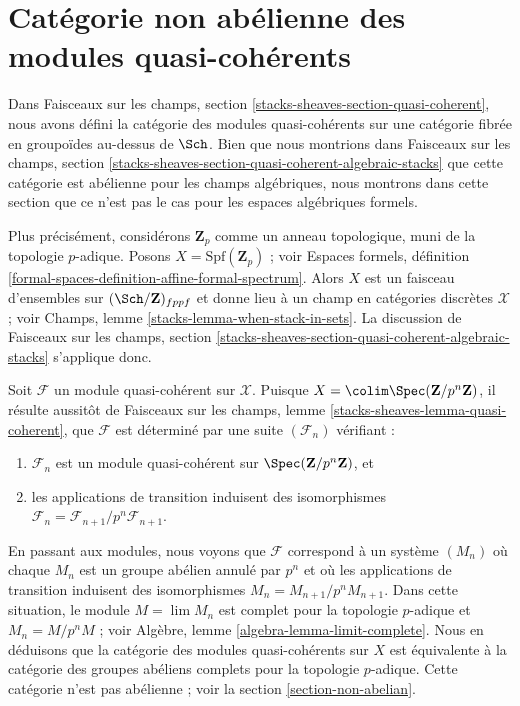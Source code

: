 \section{Catégorie non abélienne des modules quasi-cohérents}
\label{section-nonabelian-QCoh}

\noindent
Dans Faisceaux sur les champs, section \ref{stacks-sheaves-section-quasi-coherent},
nous avons défini la catégorie des modules quasi-cohérents sur une catégorie fibrée en
groupoïdes au-dessus de $\Sch$. Bien que nous montrions dans
Faisceaux sur les champs, section
\ref{stacks-sheaves-section-quasi-coherent-algebraic-stacks}
que cette catégorie est abélienne pour les champs algébriques, nous montrons dans cette
section que ce n'est pas le cas pour les espaces algébriques formels.

\medskip\noindent
Plus précisément, considérons $\mathbf{Z}_p$ comme un anneau topologique, muni de
la topologie $p$-adique. Posons $X = \text{Spf}(\mathbf{Z}_p)$ ; voir
Espaces formels, définition
\ref{formal-spaces-definition-affine-formal-spectrum}.
Alors $X$ est un faisceau d'ensembles sur $(\Sch/\mathbf{Z})_{fppf}$
et donne lieu à un champ en catégories discrètes $\mathcal{X}$ ; voir
Champs, lemme \ref{stacks-lemma-when-stack-in-sets}.
La discussion de Faisceaux sur les champs, section
\ref{stacks-sheaves-section-quasi-coherent-algebraic-stacks}
s'applique donc.

\medskip\noindent
Soit $\mathcal{F}$ un module quasi-cohérent sur $\mathcal{X}$.
Puisque $X = \colim \Spec(\mathbf{Z}/p^n\mathbf{Z})$, il résulte aussitôt de
Faisceaux sur les champs, lemme \ref{stacks-sheaves-lemma-quasi-coherent},
que $\mathcal{F}$ est déterminé par une suite $(\mathcal{F}_n)$ vérifiant :
\begin{enumerate}
\item $\mathcal{F}_n$ est un module quasi-cohérent sur
$\Spec(\mathbf{Z}/p^n\mathbf{Z})$, et
\item les applications de transition induisent des isomorphismes
$\mathcal{F}_n = \mathcal{F}_{n + 1}/p^n\mathcal{F}_{n + 1}$.
\end{enumerate}
En passant aux modules, nous voyons que $\mathcal{F}$ correspond à un
système $(M_n)$ où chaque $M_n$ est un groupe abélien annulé
par $p^n$ et où les applications de transition induisent des isomorphismes
$M_n = M_{n + 1}/p^n M_{n + 1}$. Dans cette situation, le module
$M = \lim M_n$ est complet pour la topologie $p$-adique et $M_n = M/p^n M$ ; voir
Algèbre, lemme \ref{algebra-lemma-limit-complete}.
Nous en déduisons que la catégorie des modules quasi-cohérents sur $X$
est équivalente à la catégorie des groupes abéliens complets pour
la topologie $p$-adique. Cette catégorie n'est pas abélienne ; voir
la section \ref{section-non-abelian}.

